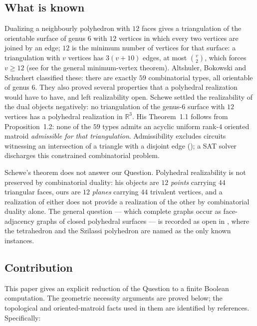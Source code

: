 \documentclass[11pt,reqno]{amsart}
\theoremstyle{plain}
\theoremstyle{definition}
\newcommand{\RR}{\mathbb{R}}
\begin{document}
\subsection{What is known}
Dualizing a neighbourly polyhedron with $12$ faces gives a triangulation of the orientable surface of
genus $6$ with $12$ vertices in which every two vertices are joined by an edge; $12$ is the minimum
number of vertices for that surface: a triangulation with $v$ vertices has $3(v+10)$ edges,
at most $\binom v2$, which forces $v\ge12$ (see \cite{JungermanRingel1980} for the general
minimum-vertex theorem). Altshuler, Bokowski and Schuchert
\cite{AltshulerBokowskiSchuchert1996} classified these: there are exactly $59$ combinatorial types,
all orientable of genus $6$. They also proved several properties that a polyhedral realization would
have to have, and left realizability open. Schewe \cite{Schewe2010} settled the realizability of the
dual objects negatively: no triangulation of the genus-$6$ surface with $12$ vertices has a
polyhedral realization in $\RR^3$. His Theorem~1.1 follows from Proposition~1.2: none of the $59$
types admits an acyclic uniform rank-$4$ oriented matroid \emph{admissible for that triangulation}.
Admissibility excludes circuits witnessing an intersection of a triangle with a disjoint edge
(\cite[Section~2]{Schewe2010}); a SAT solver discharges this constrained combinatorial problem.

Schewe's theorem does not answer our Question. Polyhedral realizability is not preserved by
combinatorial duality: his objects are $12$ \emph{points} carrying $44$ triangular faces, ours are
$12$ \emph{planes} carrying $44$ trivalent vertices, and a realization of either does not provide a realization
of the other by combinatorial duality alone. The general question --- which complete graphs occur as face-adjacency graphs of closed
polyhedral surfaces --- is recorded as open in \cite{ArsenevaEtAl2024}, where the tetrahedron and the
Szilassi polyhedron are named as the only known instances.

\subsection{Contribution}
This paper gives an explicit reduction of the Question to a finite Boolean computation.
The geometric necessity arguments are proved below; the topological and oriented-matroid
facts used in them are identified by references. Specifically:
\end{document}
